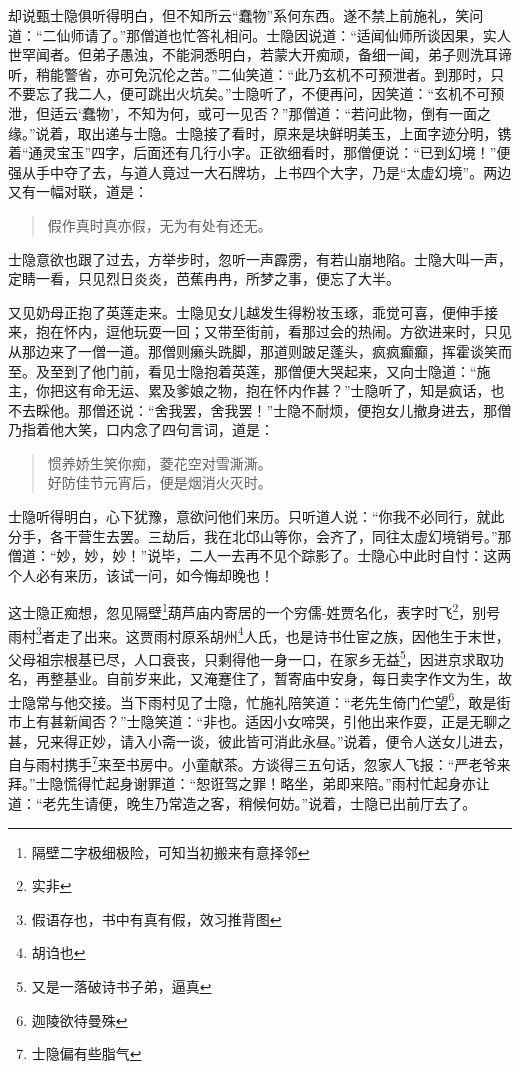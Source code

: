\documentclass[12pt,oneside]{book}
\newenvironment{shici}{%
\begin{verse}%
\centering\large\hspace{12pt}}%
{\end{verse}}
\begin{document}
却说甄士隐俱听得明白，但不知所云“蠢物”系何东西。遂不禁上前施礼，笑问道：“二仙师请了。”那僧道也忙答礼相问。士隐因说道：“适闻仙师所谈因果，实人世罕闻者。但弟子愚浊，不能洞悉明白，若蒙大开痴顽，备细一闻，弟子则洗耳谛听，稍能警省，亦可免沉伦之苦。”二仙笑道：“此乃玄机不可预泄者。到那时，只不要忘了我二人，便可跳出火坑矣。”士隐听了，不便再问，因笑道：“玄机不可预泄，但适云‘蠢物’，不知为何，或可一见否？”那僧道：“若问此物，倒有一面之缘。”说着，取出递与士隐。士隐接了看时，原来是块鲜明美玉，上面字迹分明，镌着“通灵宝玉”四字，后面还有几行小字。正欲细看时，那僧便说：“已到幻境！”便强从手中夺了去，与道人竟过一大石牌坊，上书四个大字，乃是“太虚幻境”。两边又有一幅对联，道是：

\begin{shici}
假作真时真亦假，无为有处有还无。
\end{shici}


士隐意欲也跟了过去，方举步时，忽听一声霹雳，有若山崩地陷。士隐大叫一声，定睛一看，只见烈日炎炎，芭蕉冉冉，所梦之事，便忘了大半。

又见奶母正抱了英莲走来。士隐见女儿越发生得粉妆玉琢，乖觉可喜，便伸手接来，抱在怀内，逗他玩耍一回；又带至街前，看那过会的热闹。方欲进来时，只见从那边来了一僧一道。那僧则癞头跣脚，那道则跛足蓬头，疯疯癫癫，挥霍谈笑而至。及至到了他门前，看见士隐抱着英莲，那僧便大哭起来，又向士隐道：“施主，你把这有命无运、累及爹娘之物，抱在怀内作甚？”士隐听了，知是疯话，也不去睬他。那僧还说：“舍我罢，舍我罢！”士隐不耐烦，便抱女儿撤身进去，那僧乃指着他大笑，口内念了四句言词，道是：

\begin{shici}
惯养娇生笑你痴，菱花空对雪澌澌。\\
好防佳节元宵后，便是烟消火灭时。
\end{shici}


士隐听得明白，心下犹豫，意欲问他们来历。只听道人说：“你我不必同行，就此分手，各干营生去罢。三劫后，我在北邙山等你，会齐了，同往太虚幻境销号。”那僧道：“妙，妙，妙！”说毕，二人一去再不见个踪影了。士隐心中此时自忖：这两个人必有来历，该试一问，如今悔却晚也！

这士隐正痴想，忽见隔壁\footnote{隔壁二字极细极险，可知当初搬来有意择邻}葫芦庙内寄居的一个穷儒-姓贾名化，表字时飞\footnote{实非}，别号雨村\footnote{假语存也，书中有真有假，效习推背图}者走了出来。这贾雨村原系胡州\footnote{胡诌也}人氏，也是诗书仕宦之族，因他生于末世，父母祖宗根基已尽，人口衰丧，只剩得他一身一口，在家乡无益\footnote{又是一落破诗书子弟，逼真}，因进京求取功名，再整基业。自前岁来此，又淹蹇住了，暂寄庙中安身，每日卖字作文为生，故士隐常与他交接。当下雨村见了士隐，忙施礼陪笑道：“老先生倚门伫望\footnote{迦陵欲待曼殊}，敢是街市上有甚新闻否？”士隐笑道：“非也。适因小女啼哭，引他出来作耍，正是无聊之甚，兄来得正妙，请入小斋一谈，彼此皆可消此永昼。”说着，便令人送女儿进去，自与雨村携手\footnote{士隐偏有些脂气}来至书房中。小童献茶。方谈得三五句话，忽家人飞报：“严老爷来拜。”士隐慌得忙起身谢罪道：“恕诳驾之罪！略坐，弟即来陪。”雨村忙起身亦让道：“老先生请便，晚生乃常造之客，稍候何妨。”说着，士隐已出前厅去了。
\end{document}
